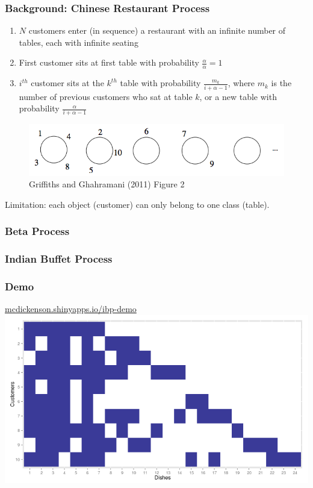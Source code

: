 \documentclass[13pt]{beamer}
\begin{document}
\begin{frame}
\frametitle{Background: Chinese Restaurant Process}

\begin{enumerate}
\item $N$ customers enter (in sequence) a restaurant with an infinite number of tables, each with infinite seating
\item First customer sits at first table with probability $\frac{\alpha}{\alpha}=1$
\item $i^{th}$ customer sits at the $k^{th}$ table with probability $\frac{m_k}{i+\alpha-1}$, where $m_k$ is the number of previous customers who sat at table $k$, or a new table with probability $\frac{\alpha}{i+\alpha-1}$
\end{enumerate}

\begin{figure}
\begin{center}
\includegraphics[scale=0.3]{./img/crp-example.png}
\caption{Griffiths and Ghahramani (2011) Figure 2}
\end{center}
\end{figure}

Limitation: each object (customer) can only belong to one class (table).

\end{frame}
\begin{frame}
\frametitle{Beta Process}
\end{frame}
\begin{frame}
\frametitle{Indian Buffet Process}
\end{frame}
\begin{frame}
\frametitle{Demo}

\begin{center}
\href{http://mcdickenson.shinyapps.io/ibp-demo}{mcdickenson.shinyapps.io/ibp-demo}
\includegraphics[scale=0.4]{./img/ibp-shiny-demo.png}
\end{center}

\end{frame}
\end{document}
